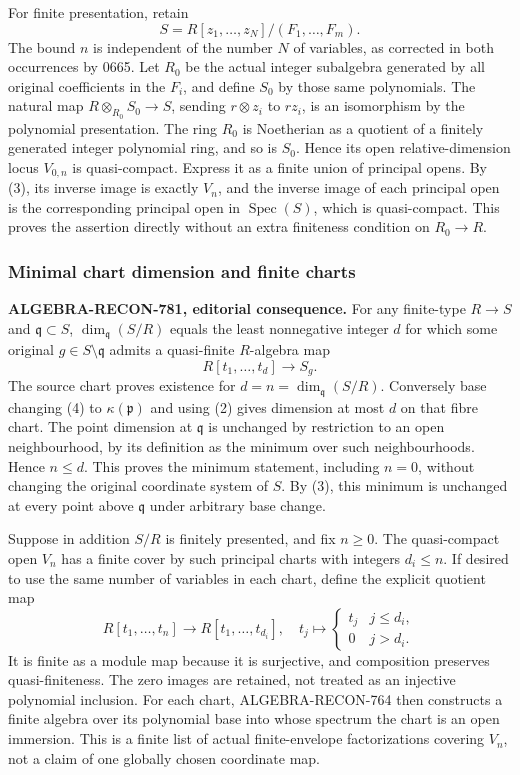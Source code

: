 For finite presentation, retain \[
 S=R[z_1,\ldots,z_N]/(F_1,\ldots,F_m).
\] The bound \(n\) is independent of the number \(N\) of variables, as corrected in both occurrences by 0665. Let \(R_0\) be the actual integer subalgebra generated by all original coefficients in the \(F_i\), and define \(S_0\) by those same polynomials. The natural map \(R\otimes_{R_0}S_0\to S\), sending \(r\otimes z_i\) to \(rz_i\), is an isomorphism by the polynomial presentation. The ring \(R_0\) is Noetherian as a quotient of a finitely generated integer polynomial ring, and so is \(S_0\). Hence its open relative-dimension locus \(V_{0,n}\) is quasi-compact. Express it as a finite union of principal opens. By (3), its inverse image is exactly \(V_n\), and the inverse image of each principal open is the corresponding principal open in \(\operatorname{Spec}(S)\), which is quasi-compact. This proves the assertion directly without an extra finiteness condition on \(R_0\to R\).

\subsubsection{Minimal chart dimension and finite charts}\label{minimal-chart-dimension-and-finite-charts}

\textbf{ALGEBRA-RECON-781, editorial consequence.} For any finite-type \(R\to S\) and \(\mathfrak q\subset S\), \(\dim_{\mathfrak q}(S/R)\) equals the least nonnegative integer \(d\) for which some original \(g\in S\setminus\mathfrak q\) admits a quasi-finite \(R\)-algebra map \[
 R[t_1,\ldots,t_d]\longrightarrow S_g.
 \tag{4}
\] The source chart proves existence for \(d=n=\dim_{\mathfrak q}(S/R)\). Conversely base changing (4) to \(\kappa(\mathfrak p)\) and using (2) gives dimension at most \(d\) on that fibre chart. The point dimension at \(\mathfrak q\) is unchanged by restriction to an open neighbourhood, by its definition as the minimum over such neighbourhoods. Hence \(n\leq d\). This proves the minimum statement, including \(n=0\), without changing the original coordinate system of \(S\). By (3), this minimum is unchanged at every point above \(\mathfrak q\) under arbitrary base change.

Suppose in addition \(S/R\) is finitely presented, and fix \(n\geq0\). The quasi-compact open \(V_n\) has a finite cover by such principal charts with integers \(d_i\leq n\). If desired to use the same number of variables in each chart, define the explicit quotient map \[
 R[t_1,\ldots,t_n]\longrightarrow R[t_1,\ldots,t_{d_i}],
 \quad t_j\longmapsto
 \begin{cases}t_j&j\leq d_i,\\0&j>d_i.\end{cases}
\] It is finite as a module map because it is surjective, and composition preserves quasi-finiteness. The zero images are retained, not treated as an injective polynomial inclusion. For each chart, ALGEBRA-RECON-764 then constructs a finite algebra over its polynomial base into whose spectrum the chart is an open immersion. This is a finite list of actual finite-envelope factorizations covering \(V_n\), not a claim of one globally chosen coordinate map.

